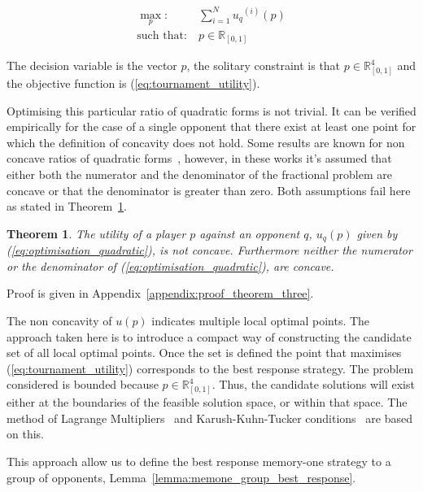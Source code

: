\documentclass[10pt]{article}
\newcommand{\R}{\mathbb{R}}
\newtheorem{theorem}{Theorem}
\begin{document}
\begin{equation}\label{eq:mo_tournament_optimisation}
    \begin{aligned}
    \max_p: & \ \sum_{i=1} ^ {N} {u_q}^{(i)} (p)
    \\
    \text{such that}: & \ p \in \R_{[0, 1]}
    \end{aligned}
\end{equation}

The decision variable is the vector \(p\), the solitary constraint is that \(p \in \R^4_{[0,
1]} \) and the objective function is (\ref{eq:tournament_utility}).

Optimising this particular ratio of quadratic forms is not trivial. It can be
verified empirically for the case of a single opponent that there exist at least
one point for which the definition of concavity does not hold. Some results are
known for non concave ratios of quadratic forms~\cite{Beck2009, Hongyan2014},
however, in these works it's assumed that either both the numerator and the
denominator of the fractional problem are concave or that the denominator is
greater than zero. Both assumptions fail here as stated in Theorem~\ref{theorem:concavity}.

\begin{theorem}\label{theorem:concavity}
    The utility of a player \(p\) against an opponent \(q\), \(u_q (p)\) given
    by (\ref{eq:optimisation_quadratic}), is not concave. Furthermore neither
    the numerator or the denominator of (\ref{eq:optimisation_quadratic}), are
    concave.
\end{theorem}

Proof is given in Appendix~\ref{appendix:proof_theorem_three}.

The non concavity of \(u(p)\) indicates multiple local optimal points. The
approach taken here is to introduce a compact way of constructing the candidate
set of all local optimal points. Once the set is defined the point that
maximises (\ref{eq:tournament_utility}) corresponds to the best response
strategy. The problem considered is bounded because \(p \in \R^4_{[0,
1]}\). Thus, the candidate solutions will exist either at the boundaries of the
feasible solution space, or within that space. The method of Lagrange
Multipliers~\cite{bertsekas2014} and Karush-Kuhn-Tucker
conditions~\cite{Giorgi2016} are based on this.

This approach allow us to define the best response memory-one strategy to a group of opponents,
Lemma~\ref{lemma:memone_group_best_response}.
\end{document}
